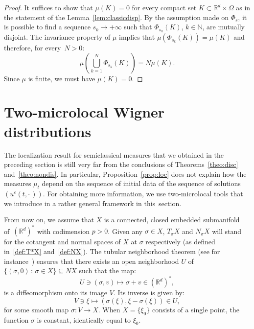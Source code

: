 \documentclass[AHL,Unicode,longabstracts]{cedram}
\newcommand*\R{{\mathbb R}}
\newcommand*\N{{\mathbb N}}
\newcommand*\eps{\varepsilon}
\numberwithin{equation}{section}
\begin{document}
\begin{proof}
It suffices to show that $\mu(K)=0$ for every compact set $K\subset\R^d\times\Omega$ as in the statement of the Lemma~\ref{lem:classicdisp}. By the assumption made on $\Phi_s$, it is possible to find a sequence $s_k\to+\infty$ such that $\Phi_{s_k}(K)$, $k\in\N$, are mutually disjoint. The invariance property of $\mu$ implies that $\mu(\Phi_{s_k}(K))=\mu(K)$ and therefore, for every~$N>0$:
\[
\mu\left(\bigcup_{k=1}^N\Phi_{s_k}(K)\right)=N\mu(K).
\]
Since $\mu$ is finite, we must have $\mu(K)=0$.
\end{proof}



\section{Two-microlocal Wigner distributions}\label{sec:two_microlocal}

The localization result for semiclassical measures that we obtained in the preceding section is still very far from the conclusions of Theorems~\ref{theo:disc} and~\ref{theo:nondis}. In particular, Proposition~\ref{prop:loc} does not explain how the measures $\mu_t$ depend on the sequence of initial data of the sequence of solutions $(u^\eps(t,\cdot\,))$. For obtaining more information, we use two-microlocal tools that we introduce in a rather general framework in this~section.



From now on, we assume that $X$ is a connected, closed embedded submanifold of~$(\R^d)^*$ with codimension $p>0$. Given any $\sigma\in X$, $T_\sigma X$ and $N_\sigma X$ will stand for the cotangent and normal spaces of $X$ at $\sigma$ respectively (as defined in~\eqref{def:T*X} and~\eqref{def:NX}). The tubular neighborhood theorem (see for instance~\cite{Hirsch}) ensures that there exists an open neighborhood $U$ of $\{(\sigma,0)\,:\,\sigma\in X\}\subseteq N X$ such that the map:
\[
U\ni (\sigma,v)\longmapsto \sigma+v\in(\R^d)^*,
\]
is a diffeomorphism onto its image $V$. Its inverse is given by:
\[
V\ni\xi \longmapsto (\sigma(\xi),\xi-\sigma(\xi))\in U,
\]
for some smooth map $\sigma:V\longrightarrow X$. When $X=\{\xi_0\}$ consists of a single point, the function $\sigma$ is constant, identically equal to $\xi_0$.

\end{document}
